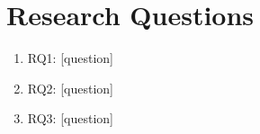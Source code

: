 \section{Research Questions}

\begin{enumerate}
  \item RQ1: [question]
  \item RQ2: [question]
  \item RQ3: [question]
\end{enumerate}
